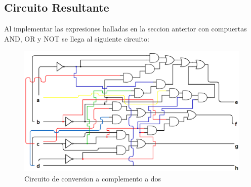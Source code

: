 \documentclass{article}
\begin{document}
	\subsection{Circuito Resultante}
	Al implementar las expresiones halladas en la seccion anterior con compuertas AND, OR y NOT se llega al siguiente circuito: 
	\begin{figure}[h!]
			\includegraphics[width=\linewidth,scale=0.5]{circuitoEj4.png}
  			\caption{Circuito de conversion a complemento a dos}
		\end{figure}
\end{document}
